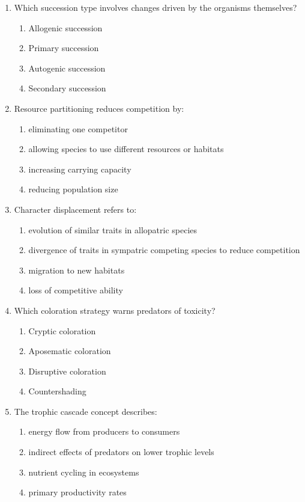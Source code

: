 \documentclass[11pt]{article}
\begin{document}
\begin{enumerate}[label=\textbf{\arabic*.}]
\clearpage

\item Which succession type involves changes driven by the organisms themselves?
\begin{enumerate}[label=\Alph*.]
  \item Allogenic succession
  \item Primary succession
  \item Autogenic succession
  \item Secondary succession
\end{enumerate}

\item Resource partitioning reduces competition by:
\begin{enumerate}[label=\Alph*.]
  \item eliminating one competitor
  \item allowing species to use different resources or habitats
  \item increasing carrying capacity
  \item reducing population size
\end{enumerate}

\item Character displacement refers to:
\begin{enumerate}[label=\Alph*.]
  \item evolution of similar traits in allopatric species
  \item divergence of traits in sympatric competing species to reduce competition
  \item migration to new habitats
  \item loss of competitive ability
\end{enumerate}

\item Which coloration strategy warns predators of toxicity?
\begin{enumerate}[label=\Alph*.]
  \item Cryptic coloration
  \item Aposematic coloration
  \item Disruptive coloration
  \item Countershading
\end{enumerate}

\item The trophic cascade concept describes:
\begin{enumerate}[label=\Alph*.]
  \item energy flow from producers to consumers
  \item indirect effects of predators on lower trophic levels
  \item nutrient cycling in ecosystems
  \item primary productivity rates
\end{enumerate}


\end{enumerate}
\end{document}
